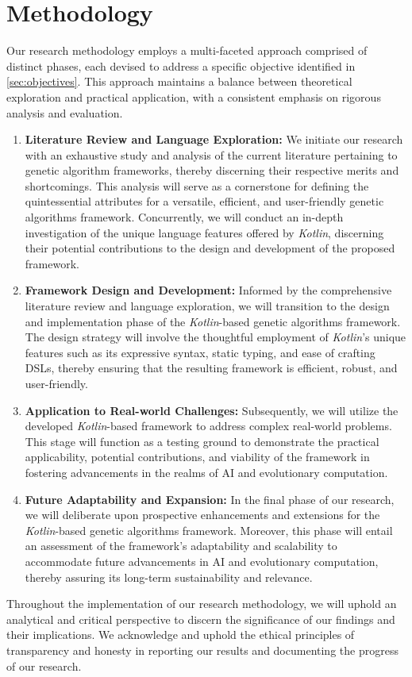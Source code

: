 \section{Methodology}
\label{sec:methodology}
  Our research methodology employs a multi-faceted approach comprised of 
  distinct phases, each devised to address a specific objective identified in 
  \vref{sec:objectives}.
  This approach maintains a balance between theoretical exploration and 
  practical application, with a consistent emphasis on rigorous analysis and 
  evaluation.
  
  \begin{enumerate}
    \item \textbf{Literature Review and Language Exploration:} We initiate our 
      research with an exhaustive study and analysis of the current literature 
      pertaining to genetic algorithm frameworks, thereby discerning their 
      respective merits and shortcomings.
      This analysis will serve as a cornerstone for defining the quintessential 
      attributes for a versatile, efficient, and user-friendly genetic 
      algorithms framework.
      Concurrently, we will conduct an in-depth investigation of the unique 
      language features offered by \textit{Kotlin}, discerning their potential 
      contributions to the design and development of the proposed framework.
    \item \textbf{Framework Design and Development:} Informed by the 
      comprehensive literature review and language exploration, we will 
      transition to the design and implementation phase of the 
      \textit{Kotlin}-based genetic algorithms framework.
      The design strategy will involve the thoughtful employment of 
      \textit{Kotlin}'s unique features such as its expressive syntax, static 
      typing, and ease of crafting DSLs, thereby ensuring that the resulting 
      framework is efficient, robust, and user-friendly.
    \item \textbf{Application to Real-world Challenges:} Subsequently, we will 
      utilize the developed \textit{Kotlin}-based framework to address complex 
      real-world problems.
      This stage will function as a testing ground to demonstrate the practical 
      applicability, potential contributions, and viability of the framework in 
      fostering advancements in the realms of AI and evolutionary computation.
    \item \textbf{Future Adaptability and Expansion:} In the final phase of our 
      research, we will deliberate upon prospective enhancements and extensions 
      for the \textit{Kotlin}-based genetic algorithms framework.
      Moreover, this phase will entail an assessment of the framework's 
      adaptability and scalability to accommodate future advancements in AI and 
      evolutionary computation, thereby assuring its long-term sustainability 
      and relevance.
  \end{enumerate}

  Throughout the implementation of our research methodology, we will uphold an analytical and critical perspective to discern the significance of our findings and their implications.
  We acknowledge and uphold the ethical principles of transparency and honesty in reporting our results and documenting the progress of our research.
